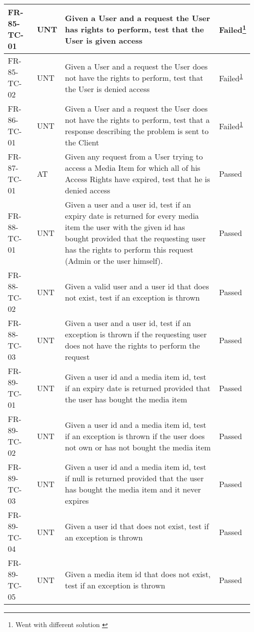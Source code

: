 \documentclass[../report.tex]{subfiles}
\newcommand{\footnoteref}[1]{\textsuperscript{\ref{#1}}}
\begin{document}
\begin{longtable}{|L{2.1cm}|L{1cm}|L{12.4cm}|L{1.4cm}|}
FR-85-TC-01&UNT&Given a User and a request the User has rights to perform, test that the User is given access &Failed\footnote{Went with different solution \label{note3}}  \\ \hline
FR-85-TC-02&UNT&Given a User and a request the User does not have the rights to perform, test that the User is denied access&Failed\footnoteref{note3}  \\ \hline
FR-86-TC-01&UNT&Given a User and a request the User does not have the rights to perform, test that a response describing the problem is sent to the Client&Failed\footnoteref{note3}  \\ \hline
FR-87-TC-01&AT&Given any request from a User trying to access a Media Item for which all of his Access Rights have expired, test that he is denied access&Passed  \\ \hline
FR-88-TC-01&UNT&Given a user and a user id, test if an expiry date is returned for every media item the user with the given id has bought provided that the requesting user has the rights to perform this request (Admin or the user himself).&Passed  \\ \hline
FR-88-TC-02&UNT&Given a valid user and a user id that does not exist, test if an exception is thrown&Passed  \\ \hline
FR-88-TC-03&UNT&Given a user and a user id, test if an exception is thrown if the requesting user does not have the rights to perform the request&Passed  \\ \hline
FR-89-TC-01&UNT&Given a user id and a media item id, test if an expiry date is returned provided that the user has bought the media item&Passed  \\ \hline
FR-89-TC-02&UNT&Given a user id and a media item id, test if an exception is thrown if the user does not own or has not bought the media item&Passed  \\ \hline
FR-89-TC-03&UNT&Given a user id and a media item id, test if null is returned provided that the user has bought the media item and it never expires&Passed  \\ \hline
FR-89-TC-04&UNT&Given a user id that does not exist, test if an exception is thrown&Passed  \\ \hline
FR-89-TC-05&UNT&Given a media item id that does not exist, test if an exception is thrown&Passed  \\ \hline
\end{longtable}
\end{document}
